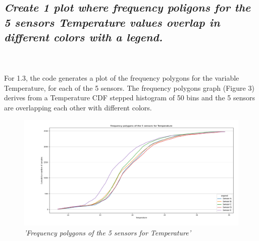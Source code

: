 \documentclass[a4paper,12pt]{article} %
\begin{document}
\subsection{\it Create 1 plot where frequency poligons for the 5 sensors Temperature values overlap in different colors with a legend.}
\\\\
For 1.3, the code generates a plot of the frequency polygons for 
the variable Temperature, for each of the 5 sensors. 
The frequency polygons graph (Figure 3) derives from a Temperature CDF 
stepped histogram of 50 bins and the 5 sensors are overlapping each other with 
different colors.
\\
\begin{figure}[H]
\centering
\includegraphics[width=\textwidth]{Graphs/Frequency_polygons_of_Temperature.png}
\caption{\it'Frequency polygons of the 5 sensors for Temperature'}
\end{figure}
\\\\
\end{document}
